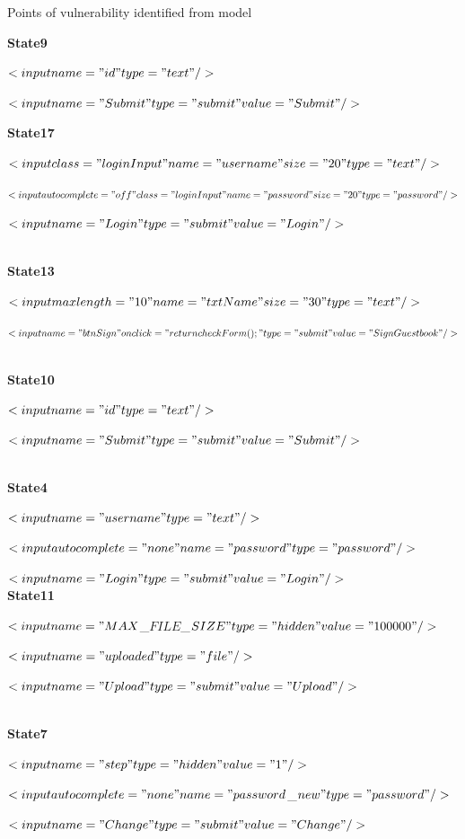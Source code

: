 \documentclass{beamer}
\begin{document}
\begin{frame}{Points of vulnerability identified from model}

\textbf{State9}

$<input name="id" type="text"/>$

$<input name="Submit" type="submit" value="Submit"/>$

\newline
\textbf{State17}

 $<input class="loginInput" name="username" size="20" type="text"/>$

 $<input autocomplete="off" class="loginInput" name="password" size="20" type="password"/>$

 $<input name="Login" type="submit" value="Login"/>$

\newline
\\
\textbf{State13}

$<input maxlength="10" name="txtName" size="30" type="text"/>$

$<input name="btnSign" onclick="return checkForm();" type="submit" value="Sign Guestbook"/>$

\end{frame}

\begin{frame}


\\
\newline
\textbf{State10}

$<input name="id" type="text"/>$

$<input name="Submit" type="submit" value="Submit"/>$

\\    
\newline
\textbf{State4}

$<input name="username" type="text"/>$

$<input autocomplete="none" name="password" type="password"/>$

$<input name="Login" type="submit" value="Login"/>$
\\
\newline
\textbf{State11}

$<input name="MAX$\_$FILE$\_$SIZE" type="hidden" value="100000"/>$

$<input name="uploaded" type="file"/>$

$<input name="Upload" type="submit" value="Upload"/>$

\\
\newline
\textbf{State7}

$<input name="step" type="hidden" value="1"/>$

$<input autocomplete="none" name="password$\_$new" type="password"/>$

 $<input name="Change" type="submit" value="Change"/>$

\end{frame}
\end{document}
